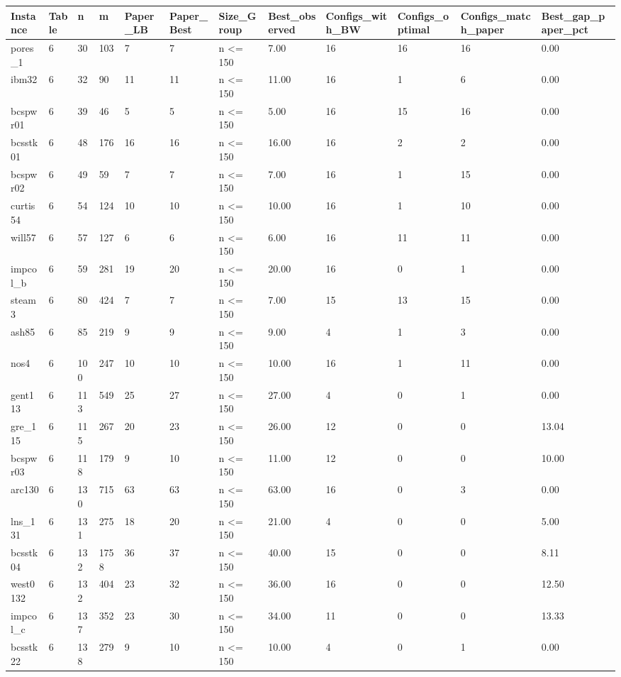 \begin{tabular}{llllllllllll}
\hline
Instance & Table & n & m & Paper\_LB & Paper\_Best & Size\_Group & Best\_observed & Configs\_with\_BW & Configs\_optimal & Configs\_match\_paper & Best\_gap\_paper\_pct \\
\hline
pores\_1 & 6 & 30 & 103 & 7 & 7 & n <= 150 & 7.00 & 16 & 16 & 16 & 0.00 \\
ibm32 & 6 & 32 & 90 & 11 & 11 & n <= 150 & 11.00 & 16 & 1 & 6 & 0.00 \\
bcspwr01 & 6 & 39 & 46 & 5 & 5 & n <= 150 & 5.00 & 16 & 15 & 16 & 0.00 \\
bcsstk01 & 6 & 48 & 176 & 16 & 16 & n <= 150 & 16.00 & 16 & 2 & 2 & 0.00 \\
bcspwr02 & 6 & 49 & 59 & 7 & 7 & n <= 150 & 7.00 & 16 & 1 & 15 & 0.00 \\
curtis54 & 6 & 54 & 124 & 10 & 10 & n <= 150 & 10.00 & 16 & 1 & 10 & 0.00 \\
will57 & 6 & 57 & 127 & 6 & 6 & n <= 150 & 6.00 & 16 & 11 & 11 & 0.00 \\
impcol\_b & 6 & 59 & 281 & 19 & 20 & n <= 150 & 20.00 & 16 & 0 & 1 & 0.00 \\
steam3 & 6 & 80 & 424 & 7 & 7 & n <= 150 & 7.00 & 15 & 13 & 15 & 0.00 \\
ash85 & 6 & 85 & 219 & 9 & 9 & n <= 150 & 9.00 & 4 & 1 & 3 & 0.00 \\
nos4 & 6 & 100 & 247 & 10 & 10 & n <= 150 & 10.00 & 16 & 1 & 11 & 0.00 \\
gent113 & 6 & 113 & 549 & 25 & 27 & n <= 150 & 27.00 & 4 & 0 & 1 & 0.00 \\
gre\_115 & 6 & 115 & 267 & 20 & 23 & n <= 150 & 26.00 & 12 & 0 & 0 & 13.04 \\
bcspwr03 & 6 & 118 & 179 & 9 & 10 & n <= 150 & 11.00 & 12 & 0 & 0 & 10.00 \\
arc130 & 6 & 130 & 715 & 63 & 63 & n <= 150 & 63.00 & 16 & 0 & 3 & 0.00 \\
lns\_131 & 6 & 131 & 275 & 18 & 20 & n <= 150 & 21.00 & 4 & 0 & 0 & 5.00 \\
bcsstk04 & 6 & 132 & 1758 & 36 & 37 & n <= 150 & 40.00 & 15 & 0 & 0 & 8.11 \\
west0132 & 6 & 132 & 404 & 23 & 32 & n <= 150 & 36.00 & 16 & 0 & 0 & 12.50 \\
impcol\_c & 6 & 137 & 352 & 23 & 30 & n <= 150 & 34.00 & 11 & 0 & 0 & 13.33 \\
bcsstk22 & 6 & 138 & 279 & 9 & 10 & n <= 150 & 10.00 & 4 & 0 & 1 & 0.00 \\

\end{tabular}

